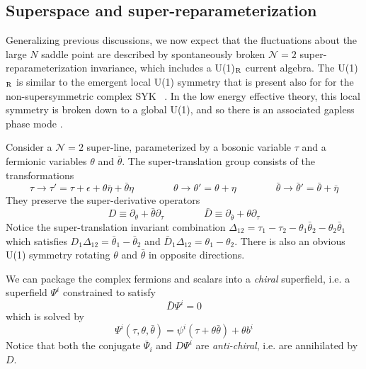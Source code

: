 \documentclass[aps,pre,preprint,onecolumn,citeautoscript,superscriptaddress,nofootinbib,eqsecnum]{revtex4-1}
\begin{document}
\subsection{Superspace and super-reparameterization}

Generalizing  previous discussions, we now expect that the fluctuations about the large $N$ saddle
point are described by spontaneously broken $\mathcal{N}=2$ super-reparameterization invariance, which includes a U(1)$_{\rm R}$ current algebra. 
The U(1)$_{\rm R}$ is similar to  the  emergent local U(1) symmetry that is present also for  for the non-supersymmetric complex SYK
  ~\cite{SS15}. In the low energy effective theory, this local symmetry  is broken down
to a global U(1), and so there is an associated gapless phase mode \cite{FGS16}.

Consider a $\mathcal{N}=2$ super-line, parameterized by a bosonic variable $\tau$ and a fermionic variables $\theta$ and $\bar \theta$. 
The super-translation group consists of the transformations
\begin{equation}
\tau \to \tau' = \tau + \epsilon + \theta \bar \eta + \bar \theta \eta  \qquad \qquad \theta \to \theta' = \theta + \eta \qquad \qquad \bar \theta \to \bar \theta' = \bar \theta + \bar \eta
\end{equation}
They preserve the super-derivative operators 
\begin{equation}
D \equiv \partial_\theta + \bar \theta \partial_\tau \qquad \qquad \bar D \equiv \partial_{\bar \theta} + \theta \partial_\tau
\end{equation}
Notice the super-translation invariant combination $\Delta_{12} = \tau_1 - \tau_2 - \theta_1 \bar \theta_2- \theta_2 \bar \theta_1$
which satisfies $D_1\Delta_{12}  = \bar \theta_1 - \bar \theta_2$ and $\bar D_1\Delta_{12}  = \theta_1 - \theta_2$. 
There is also an obvious  U(1)  symmetry rotating $\theta$ and $\bar \theta$ in opposite directions.  

We can package the complex fermions and scalars into a {\it chiral} superfield, i.e. a superfield $\Psi^i$ 
constrained to satisfy 
\begin{equation}
\bar D \Psi^i = 0 
\end{equation}
which is solved by 
\begin{equation}
\Psi^i(\tau, \theta, \bar \theta) = \psi^i(\tau + \theta \bar \theta)+ \theta b^i
\end{equation}
Notice that both the conjugate $\bar \Psi_i$ and $D \Psi^i$ are {\it anti-chiral}, i.e. are annihilated by $D$. 
\end{document}
